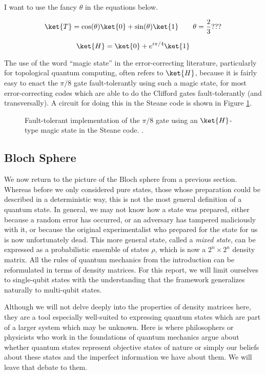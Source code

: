 I want to use the fancy $\theta$ in the equations below.

\begin{displaymath}
\ket{T} = \cos(\theta) \ket{0} + \sin(\theta) \ket{1} \qquad \theta = \frac{2}{3}???
\end{displaymath}

\begin{displaymath}
\ket{H} = \ket{0} + e^{i\pi/4} \ket{1}
\end{displaymath}

The use of the word ``magic state'' in the error-correcting literature,
particularly for topological quantum computing, often refers to $\ket{H}$,
because it is fairly easy to enact the $\pi/8$ gate fault-tolerantly using
such a magic state, for most error-correcting codes which are able to do
the Clifford gates fault-tolerantly (and transversally).
A circuit for doing this in the Steane code is shown in Figure \ref{fig:steane-pi8}.

\begin{figure}
\label{fig:steane-pi8}
\caption{Fault-tolerant implementation of the $\pi/8$ gate using an $\ket{H}$-type
magic state in the Steane code. \cite{Fowler2003}.}
\end{figure}

\subsection{Bloch Sphere}

We now return to the picture of the Bloch sphere from a previous section.
Whereas before we only considered pure states, those whose preparation could
be described in a deterministic way, this is not the most general definition
of a quantum state. In general, we may not know how a state was prepared,
either because a random error has occurred, or an adversary has tampered
maliciously with it, or because the original experimentalist who prepared
for the state for us is now unfortunately dead. This more general state,
called a \emph{mixed state}, can be expressed as a probabilistic ensemble of
states $\rho$, which is now a $2^n \times 2^n$ density matrix. All the
rules of quantum mechanics from the introduction can be reformulated in
terms of density matrices. For this report,
we will limit ourselves to single-qubit states with the understanding that
the framework generalizes naturally to multi-qubit states.

Although we
will not delve deeply into the properties of density matrices here, they are
a tool especially well-suited to expressing quantum states which are part
of a larger system which may be unknown. Here is where philosophers or
physicists who work in the foundations of quantum mechanics argue about whether
quantum states represent objective states of nature or simply our beliefs about
these states and the imperfect information we have about them. We will leave
that debate to them.

